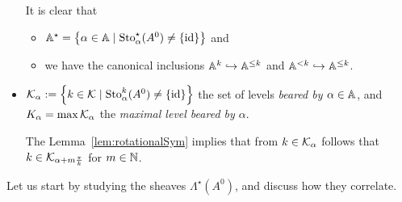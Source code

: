 \begin{notations}
\begin{itemize}
\begin{s-rem}
        It is clear that
        \begin{itemize}
          \item $\mathbb{A}^{\star}=\left\{\alpha\in\mathbb{A}
            \mid\operatorname{Sto}_{\alpha}^\star(A^0)\neq\{\operatorname{id}\}\right\}$ and
          \item we have the canonical inclusions
            $\mathbb{A}^k\hookrightarrow\mathbb{A}^{\leq k}$ and
            $\mathbb{A}^{<k}\hookrightarrow\mathbb{A}^{\leq k}$.
        \end{itemize}
      \end{s-rem}
    \item $\mathcal{K}_\alpha:=\left\{k\in\mathcal{K}\mid\operatorname{Sto}_\alpha^k(A^0)\neq\{\operatorname{id}\}\right\}$
      the set of levels \emph{beared by $\alpha\in\mathbb{A}$}, and
      $K_\alpha=\max\mathcal{K}_\alpha$ the \emph{maximal level beared by $\alpha$}.
      \begin{s-rem}
        The Lemma~\ref{lem:rotationalSym} implies that from $k\in\mathcal{K}_{\alpha}$
        follows that $k\in\mathcal{K}_{\alpha+m\frac{\pi}{k}}$ for $m\in\mathbb{N}$.
      \end{s-rem}
  \end{itemize}
\end{notations}
 Let us start
by studying the sheaves $\Lambda^\star(A^0)$, and discuss how they correlate.

